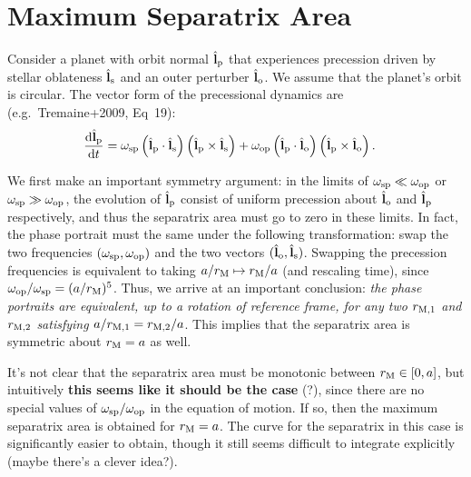 \documentclass[11pt,
        usenames, %
        dvipsnames %
    ]{article}
\newcommand*{\rd}[2]{\frac{\mathrm{d}#1}{\mathrm{d}#2}}
\newcommand*{\bm}[1]{\boldsymbol{\mathbf{#1}}}
\newcommand*{\uv}[1]{\hat{\bm{#1}}}
\newcommand*{\p}[1]{\left(#1\right)}
\newcommand*{\s}[1]{\left[#1\right]}
\begin{document}
\section{Maximum Separatrix Area}

Consider a planet with orbit normal $\uv{l}_{\rm p}$ that experiences precession
driven by stellar oblateness $\uv{l}_{\rm s}$ and an outer perturber
$\uv{l}_{\rm o}$. We assume that the planet's orbit is circular. The vector
form of the precessional dynamics are (e.g.\ Tremaine+2009, Eq~19):
\begin{align}
    \rd{\uv{l}_{\rm p}}{t}
        &= \omega_{\rm sp} \p{\uv{l}_{\rm p} \cdot \uv{l}_{\rm s}}
            \p{\uv{l}_{\rm p} \times \uv{l}_{\rm s}}
            + \omega_{\rm op} \p{\uv{l}_{\rm p} \cdot \uv{l}_{\rm o}}
            \p{\uv{l}_{\rm p} \times \uv{l}_{\rm o}}.
\end{align}

We first make an important symmetry argument: in the limits of $\omega_{\rm sp}
\ll \omega_{\rm op}$ or $\omega_{\rm sp} \gg \omega_{\rm op}$, the evolution of
$\uv{l}_{\rm p}$ consist of uniform precession about $\uv{l}_{\rm o}$ and
$\uv{l}_{\rm p}$ respectively, and thus the separatrix area must go to zero in
these limits. In fact, the phase portrait must the same under the following
transformation: swap the two frequencies $(\omega_{\rm sp}, \omega_{\rm op})$
and the two vectors $(\uv{l}_{\rm o}, \uv{l}_{\rm s})$. Swapping the precession
frequencies is equivalent to taking $a / r_{\rm M} \mapsto r_{\rm M} / a$ (and
rescaling time), since $\omega_{\rm op} / \omega_{\rm sp} = (a / r_{\rm M})^5$.
Thus, we arrive at an important conclusion: \emph{the phase portraits are
equivalent, up to a rotation of reference frame, for any two $r_{\rm M,1}$ and
$r_{\rm M, 2}$ satisfying $a / r_{\rm M, 1} = r_{\rm M, 2} / a$}. This implies
that the separatrix area is symmetric about $r_{\rm M} = a$ as well.

It's not clear that the separatrix area must be monotonic between $r_{\rm M} \in
\s{0, a}$, but intuitively \textbf{this seems like it should be the case} (?),
since there are no special values of $\omega_{\rm sp} / \omega_{\rm op}$ in the
equation of motion. If so, then the maximum separatrix area is obtained for
$r_{\rm M} = a$. The curve for the separatrix in this case is significantly
easier to obtain, though it still seems difficult to integrate explicitly (maybe
there's a clever idea?).
\end{document}
